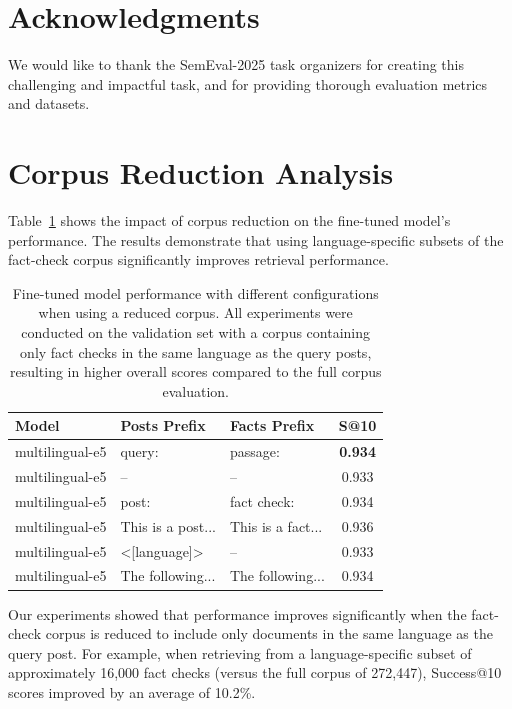 \documentclass[11pt]{article}
\begin{document}
\section{Acknowledgments}

We would like to thank the SemEval-2025 task organizers for creating this challenging and impactful task, and for providing thorough evaluation metrics and datasets.

%


\appendix

\section{Corpus Reduction Analysis}
\label{sec:appendix-results}

Table~\ref{tab:prefix-experiments} shows the impact of corpus reduction on the fine-tuned model's performance. The results demonstrate that using language-specific subsets of the fact-check corpus significantly improves retrieval performance.

\begin{table}[h]
  \centering
  \small
  \begin{tabular}{p{2.5cm}p{1.8cm}p{1.8cm}c}
    \hline
    \textbf{Model} & \textbf{Posts Prefix} & \textbf{Facts Prefix} & \textbf{S@10} \\
    \hline
    multilingual-e5 & query: & passage: & \textbf{0.934} \\
    multilingual-e5 & -- & -- & 0.933 \\
    multilingual-e5 & post: & fact check: & 0.934 \\
    multilingual-e5 & This is a post... & This is a fact... & 0.936 \\
    multilingual-e5 & <[language]> & -- & 0.933 \\
    multilingual-e5 & The following... & The following... & 0.934 \\
    \hline
  \end{tabular}
  \caption{Fine-tuned model performance with different configurations when using a reduced corpus. All experiments were conducted on the validation set with a corpus containing only fact checks in the same language as the query posts, resulting in higher overall scores compared to the full corpus evaluation.}
  \label{tab:prefix-experiments}
\end{table}

Our experiments showed that performance improves significantly when the fact-check corpus is reduced to include only documents in the same language as the query post. For example, when retrieving from a language-specific subset of approximately 16,000 fact checks (versus the full corpus of 272,447), Success@10 scores improved by an average of 10.2\%.
\end{document}

